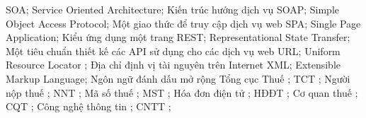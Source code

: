 

SOA; Service Oriented Architecture; Kiến trúc hướng dịch vụ
SOAP; Simple Object Access Protocol; Một giao thức để truy cập dịch vụ web
SPA; Single Page Application; Kiểu ứng dụng một trang
REST; Representational State Transfer; Một tiêu chuẩn thiết kế các API sử dụng cho các dịch vụ web
URL; Uniform Resource Locator ; Địa chỉ định vị tài nguyên trên Internet
XML; Extensible Markup Language; Ngôn ngữ đánh dấu mở rộng
Tổng cục Thuế ; TCT ;
Người nộp thuế ; NNT ;
Mã số thuế ; MST ;
Hóa đơn điện tử ; HĐĐT ;
Cơ quan thuế ; CQT ;
Công nghệ thông tin ; CNTT ;

